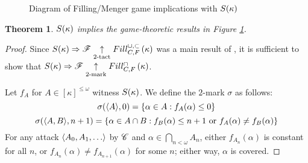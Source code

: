 \documentclass{amsart}
\newtheorem{theorem}{Theorem}[section]
\theoremstyle{definition}
\begin{document}
\begin{figure}[h]
\begin{center}


\end{center}
\caption{Diagram of Filling/Menger game implications with \(S(\kappa)\)}
\label{fillingGamesDiagram2}
\end{figure}

\begin{theorem}
  \(S(\kappa)\) implies the game-theoretic results in
  Figure \ref{fillingGamesDiagram2}.
\end{theorem}

\begin{proof}
  Since \(S(\kappa)\Rightarrow\mathscr{F} \underset{2\text{-tact}}{\uparrow}Fill^{\cup,\subset}_{C,F}\left({\kappa}\right)\) was
  a main result of \cite{MR1129143}, it is sufficient to show that
  \(S(\kappa)\Rightarrow \mathscr{F} \underset{2\text{-mark}}{\uparrow}Fill^{\cap}_{C,F}\left({\kappa}\right)\).

  Let \(f_A\) for \(A\in[\kappa]^{\leq\omega}\) witness \(S(\kappa)\). We define
  the \(2\)-mark \(\sigma\) as follows:
    \[
      \sigma(\langle A\rangle,0) = \{\alpha\in A: f_A(\alpha) \leq 0 \}
    \]
    \[
      \sigma(\langle A,B\rangle,n+1)
        =
      \{
        \alpha \in A\cap B
      :
        f_B(\alpha) \leq n+1 \text{ or }
        f_A(\alpha)\not=f_B(\alpha)
      \}
    \]
  For any attack \(\<A_0,A_1,\dots\>\) by \(\mathscr{C}\) and
  \(\alpha\in\bigcap_{n<\omega}A_n\), either \(f_{A_n}(\alpha)\) is constant for
  all \(n\), or \(f_{A_n}(\alpha)\not=f_{A_{n+1}}(\alpha)\) for some \(n\);
  either way, \(\alpha\) is covered.
\end{proof}
\end{document}
